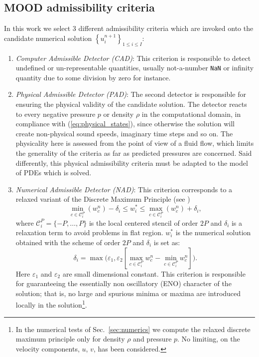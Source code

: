 \subsection{MOOD admissibility criteria} \label{ssec:MOODdetection}
In this work we select 3 different admissibility criteria 
\cite{CDL2,CDL3} which are invoked onto the candidate numerical solution $\left\{ u_i^{n+1} \right\}_{1\leq i \leq I}$:
\begin{enumerate}
    \item 
    \textit{Computer Admissible Detector (CAD)}: This criterion is responsible to detect 
    undefined or un-representable quantities, usually
    not-a-number \texttt{NaN} or infinity quantity due to some division by zero for instance.
    \item 
    \textit{Physical Admissible Detector (PAD)}: The second detector is responsible for ensuring the physical validity of the candidate solution. The detector reacts to every negative pressure $p$ or density $\rho$ in the computational domain, 
    in compliance with (\ref{eq:physical_states}), since otherwise the solution will create non-physical sound speeds, imaginary time steps and so on. 
    The physicality here is assessed from the point of view of a fluid flow, which limits the generality of the criteria as far as predicted pressures are concerned. 
    Said differently, this physical admissibility criteria must be adapted to the model of PDEs which is solved.
    \item 
    \textit{Numerical Admissible Detector (NAD)}: This criterion corresponds to a relaxed variant of the Discrete Maximum Principle (see \cite{Ciarlet,CDL1})
    $$\min_{c\in \mathcal{C}_i^P}(w^n_c) - \delta_i \le w^*_i \le \max_{c\in \mathcal{C}_i^P}(w^n_c) + \delta_i, $$
    where $\mathcal{C}_i^P = \{-P,\ldots,P\}$ is the local centered stencil of order $2P$ and $\delta_i$ is a relaxation term to avoid problems in flat region. $w^*_i$ is the numerical solution obtained with the scheme of order $2P$ and $\delta_i$ is set as:
    \begin{equation}
        \label{eq:delta}
        \delta_i = \max\Big(\varepsilon_1,\varepsilon_2\left[\max_{c\in \mathcal{C}_i^P}w^n_c - \min_{c\in \mathcal{C}_i^P}w^n_c\right]\Big). 
    \end{equation}
    Here $\varepsilon_1$ and $\varepsilon_2$ are small dimensional constant. 
    This criterion is responsible for guaranteeing the essentially non oscillatory (ENO) character of the solution; that is, no large and spurious minima or maxima are introduced locally in the solution\footnote{In the numerical tests of Sec.~\ref{sec:numerics} we compute the relaxed discrete maximum principle only for density $\rho$ and pressure $p$. No limiting, on the velocity components, $u$, $v$, has been considered.}. 
\end{enumerate}    
